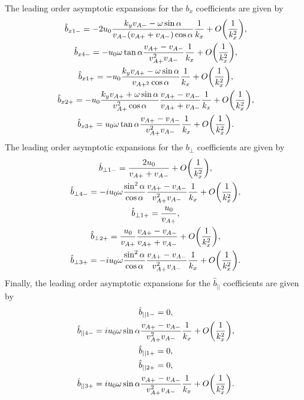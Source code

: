 The leading order asymptotic expansions for the $b_x$ coefficients are given by
\begin{gather}
    \hat{b}_{x 1-} = -2u_0\frac{k_yv_{A-}-\omega\sin\alpha}{v_{A-}(v_{A+}+v_{A-})\cos\alpha}\frac{1}{k_x} + O\qty(\frac{1}{k_x^2}), \\
    \hat{b}_{x 4-} = -u_0\omega\tan\alpha\frac{v_{A+}-v_{A-}}{v_{A+}^2v_{A-}}\frac{1}{k_x} + O\qty(\frac{1}{k_x^2}), \\
    \hat{b}_{x 1+} = -u_0\frac{k_yv_{A+}-\omega\sin\alpha}{v_{A+^2}\cos\alpha}\frac{1}{k_x} + O\qty(\frac{1}{k_x^2}), \\
    \hat{b}_{x 2+} = -u_0\frac{k_y v_{A+} + \omega \sin\alpha}{v_{A+}^2 \cos\alpha}\frac{v_{A+} - v_{A-}}{v_{A+} + v_{A-}}\frac{1}{k_x} + O\qty(\frac{1}{k_x^2}), \\
    \hat{b}_{x 3+} = u_0\omega\tan\alpha\frac{v_{A+}-v_{A-}}{v_{A+}^2v_{A-}}\frac{1}{k_x} + O\qty(\frac{1}{k_x^2}).
\end{gather}
The leading order asymptotic expansions for the $b_\perp$ coefficients are given by
\begin{gather}
    \hat{b}_{\perp 1-} = \frac{2u_0}{v_{A+}+v_{A-}} + O\qty(\frac{1}{k_x^2}), \\
    \hat{b}_{\perp 4-} = -iu_0\omega\frac{\sin^2\alpha}{\cos\alpha}\frac{v_{A+}-v_{A-}}{v_{A+}^2v_{A-}}\frac{1}{k_x} + O\qty(\frac{1}{k_x^2}), \\
    \hat{b}_{\perp 1+} = \frac{u_0}{v_{A+}}, \\
    \hat{b}_{\perp 2+} = \frac{u_0}{v_{A+}}\frac{v_{A+}-v_{A-}}{v_{A+}+v_{A-}} + O\qty(\frac{1}{k_x^2}), \\
    \hat{b}_{\perp 3+} = -iu_0\omega\frac{\sin^2\alpha}{\cos\alpha}\frac{v_{A+}-v_{A-}}{v_{A+}^2v_{A-}}\frac{1}{k_x} + O\qty(\frac{1}{k_x^2}).
\end{gather}
Finally, the leading order asymptotic expansions for the $\hat{b}_{||}$ coefficients are given by
\begin{gather}
    \hat{b}_{|| 1-} = 0, \\
    \hat{b}_{|| 4-} = iu_0\omega\sin\alpha\frac{v_{A+}-v_{A-}}{v_{A+}^2v_{A-}}\frac{1}{k_x} + O\qty(\frac{1}{k_x^2}), \\
    \hat{b}_{|| 1+} = 0, \\
    \hat{b}_{|| 2+} = 0, \\
    \label{eq:oblique_field_uniform_in_x_b_par30+}
    \hat{b}_{|| 3+} = iu_0\omega\sin\alpha\frac{v_{A+}-v_{A-}}{v_{A+}^2v_{A-}}\frac{1}{k_x} + O\qty(\frac{1}{k_x^2}).
\end{gather}
